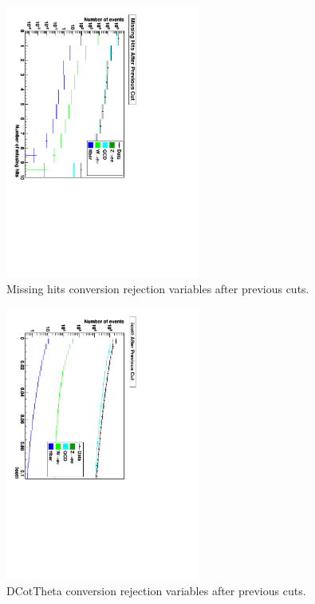 
 \begin{figure}[htb]
  \begin{center}
    \includegraphics[width=180pt, angle=90]{missHitsSeq.pdf}
  \end{center}
  \caption[Missing hits conversion rejection variables after previous cuts]{Missing hits conversion rejection variables after previous cuts.}
  \label{fig:MissHitsConvRejVars}
 \end{figure}

 \begin{figure}[htb]
  \begin{center}
    \includegraphics[width=180pt, angle=90]{dCotThetaSeq.pdf}
  \end{center}
  \caption[DCotTheta conversion rejection variables after previous cuts]{DCotTheta conversion rejection variables after previous cuts.}
  \label{fig:DCotConvRejVars}
 \end{figure}

